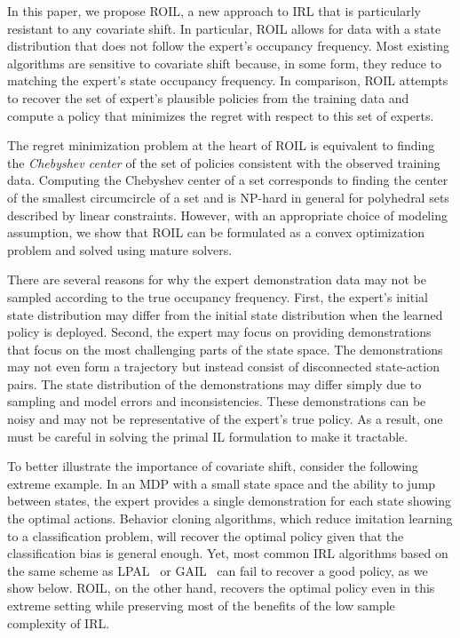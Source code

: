 \documentclass[10pt]{article}
\renewcommand{\cite}{\citep}
\begin{document}
In this paper, we propose ROIL, a new approach to IRL that is particularly resistant to any covariate shift. In particular, ROIL allows for data with a state distribution that does not follow the expert's occupancy frequency. Most existing algorithms are sensitive to covariate shift because, in some form, they reduce to matching the expert's state occupancy frequency. In comparison, ROIL attempts to recover the set of expert's plausible policies from the training data and compute a policy that minimizes the regret with respect to this set of experts.

The regret minimization problem at the heart of ROIL is equivalent to finding the \emph{Chebyshev center} of the set of policies consistent with the observed training data. Computing the Chebyshev center of a set corresponds to finding the center of the smallest circumcircle of a set and is NP-hard in general for polyhedral sets described by linear constraints. However, with an appropriate choice of modeling assumption, we show that ROIL can be formulated as a convex optimization problem and solved using mature solvers.

There are several reasons for why the expert demonstration data may not be sampled according to the true occupancy frequency. First, the expert's initial state distribution may differ from the initial state distribution when the learned policy is deployed. Second, the expert may focus on providing demonstrations that focus on the most challenging parts of the state space. The demonstrations may not even form a trajectory but instead consist of disconnected state-action pairs. The state distribution of the demonstrations may differ simply due to sampling and model errors and inconsistencies. These demonstrations can be noisy and may not be representative of the expert's true policy. As a result, one must be careful in solving the primal IL formulation to make it tractable.

To better illustrate the importance of covariate shift, consider the following extreme example. In an MDP with a small state space and the ability to jump between states, the expert provides a single demonstration for each state showing the optimal actions. Behavior cloning algorithms, which reduce imitation learning to a classification problem, will recover the optimal policy given that the classification bias is general enough. Yet, most common IRL algorithms based on the same scheme as LPAL~\cite{Syed2008} or GAIL~\cite{Ho2016} can fail to recover a good policy, as we show below. ROIL, on the other hand, recovers the optimal policy even in this extreme setting while preserving most of the benefits of the low sample complexity of IRL.
\end{document}

